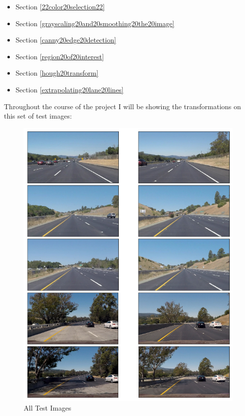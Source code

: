 \documentclass[11pt]{article}
\makeatletter
\def\maxwidth{\ifdim\Gin@nat@width>\linewidth\linewidth
    \else\Gin@nat@width\fi}
\let\Oldincludegraphics\includegraphics
\renewcommand{\includegraphics}[1]{\Oldincludegraphics[width=.8\maxwidth]{#1}}
\providecommand{\tightlist}{%
      \setlength{\itemsep}{0pt}\setlength{\parskip}{0pt}}
\makeatother
\begin{document}
\begin{itemize}
\tightlist
\item
  Section \ref{22color20selection22}
\item
  Section \ref{grayscaling20and20smoothing20the20image}
\item
  Section \ref{canny20edge20detection}
\item
  Section \ref{region20of20interest}
\item
  Section \ref{hough20transform}
\item
  Section \ref{extrapolating20lane20lines}
\end{itemize}

Throughout the course of the project I will be showing the
transformations on this set of test images:

\begin{figure}
\centering
\includegraphics{test_images_output/all_test_images.png}
\caption{All Test Images}
\end{figure}
\end{document}
